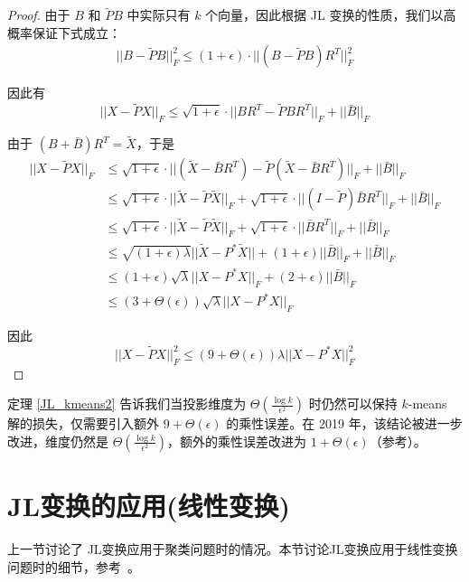 \documentclass[lang=cn,newtx,10pt,scheme=chinese,chinesefont=nofont,citestyle=gb7714-2015, bibstyle=gb7714-2015]{elegantbook}
\begin{document}
\begin{refsection}
\begin{proof}
    由于 $B$ 和 $\tilde PB$ 中实际只有 $k$ 个向量，因此根据 JL 变换的性质，我们以高概率保证下式成立：
    \begin{align*}
        ||B-\tilde PB||_F^2 \le (1+\epsilon)\cdot ||(B-\tilde PB)R^T||_F^2
    \end{align*}
    
    因此有
    \begin{equation*}
        ||X-\tilde PX||_F \le \sqrt{1+\epsilon} \cdot||BR^T-\tilde PBR^T||_F + ||\bar B||_F
    \end{equation*}

    由于 $(B+\bar B)R^T=\tilde X$，于是
    \begin{align*}
        ||X-\tilde PX||_F &\le \sqrt{1+\epsilon} \cdot||(\tilde X-\bar BR^T)-\tilde P(\tilde X-\bar BR^T)||_F + ||\bar B||_F \\
        &\le \sqrt{1+\epsilon} \cdot||\tilde X-\tilde P\tilde X||_F + \sqrt{1+\epsilon}\cdot ||(I-\tilde P)\bar BR^T||_F + ||\bar B||_F \\
        &\le \sqrt{1+\epsilon} \cdot||\tilde X-\tilde P\tilde X||_F + \sqrt{1+\epsilon}\cdot ||\bar BR^T||_F + ||\bar B||_F \\
        &\le \sqrt{(1+\epsilon)\lambda} ||\tilde X-P^*\tilde X|| + (1+\epsilon) ||\bar B||_F + ||\bar B||_F \\
        &\le (1+\epsilon)\sqrt{\lambda}||X-P^*X||_F + (2+\epsilon)||\bar B||_F \\
        &\le (3+\Theta(\epsilon))\sqrt{\lambda} ||X-P^*X||_F
    \end{align*}

    因此
    \begin{equation*}
        ||X-\tilde PX||_F^2 \le (9+\Theta(\epsilon))\lambda||X-P^*X||_F^2
    \end{equation*}
\end{proof}

定理 \ref{JL_kmeans2} 告诉我们当投影维度为 $\Theta(\frac{\log k}{\epsilon^2})$ 时仍然可以保持 $k$-means 解的损失，仅需要引入额外 $9+\Theta(\epsilon)$ 的乘性误差。在 2019 年，该结论被进一步改进，维度仍然是 $\Theta(\frac{\log k}{\epsilon^2})$，额外的乘性误差改进为 $1+\Theta(\epsilon)$（参考\cite{makarychev2019performance}）。
\section{JL变换的应用(线性变换)}
上一节讨论了 JL变换应用于聚类问题时的情况。本节讨论JL变换应用于线性变换问题时的细节，参考~\cite{woodruff2014sketching}。


\end{refsection}
\end{document}
